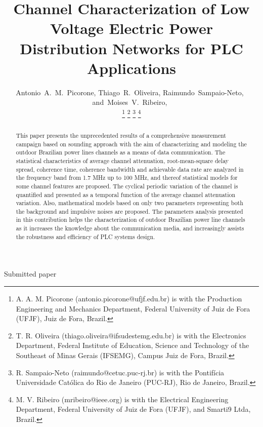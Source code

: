 \documentclass[journal]{IEEEtran}
\begin{document}
\title{Channel Characterization of Low Voltage Electric Power Distribution Networks for PLC Applications}

\author{Antonio~A.~M.~Picorone,
        Thiago~R.~Oliveira,  
        Raimundo~Sampaio-Neto,~     
        and~Moises~V.~Ribeiro,~%

 \thanks{A. A. M. Picorone (antonio.picorone@ufjf.edu.br) is with the Production Engineering and Mechanics Department, Federal University of Juiz de Fora (UFJF), Juiz de Fora, Brazil.}%
 \thanks{T. R. Oliveira (thiago.oliveira@ifsudestemg.edu.br) is with the Electronics Department, Federal Institute of Education, Science and Technology of the Southeast of Minas Gerais (IFSEMG), Campus Juiz de Fora, Brazil.}%
 \thanks{R. Sampaio-Neto (raimundo@cetuc.puc-rj.br) is with the Pontif\'icia Universidade Cat\'olica do Rio de Janeiro (PUC-RJ), Rio de Janeiro, Brazil.}%
\thanks{M. V. Ribeiro (mribeiro@ieee.org) is with the Electrical Engineering Department,
Federal University of Juiz de Fora (UFJF), and Smarti9 Ltda, Brazil.}%
}

%
{Submitted paper}

\maketitle

\begin{abstract}
This paper presents the unprecedented results of a comprehensive measurement campaign based on sounding approach with the aim of characterizing and modeling the outdoor Brazilian power lines channels as a means of data communication. The statistical characteristics of average channel attenuation, root-mean-square delay spread, coherence time, coherence bandwidth and achievable data rate are analyzed in the frequency band from 1.7 MHz up to 100 MHz, and  thereof  statistical models for some channel features are proposed. 
The cyclical periodic variation of the channel is quantified and presented as a temporal function of the average channel attenuation variation. 
Also, mathematical models based on only two parameters representing both the background and impulsive noises are proposed. 
The parameters analysis presented in this contribution helps the characterization of outdoor Brazilian power line channels as it increases the knowledge about the communication media, and increasingly assists the robustness and efficiency of \ac{PLC} systems design.
\end{abstract}
\end{document}
